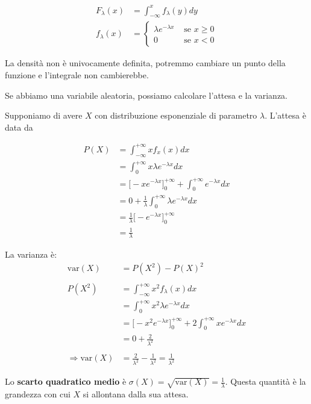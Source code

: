 \documentclass[a4paper,12pt]{book}
\newcommand\ddfrac[2]{\frac{\displaystyle #1}{\displaystyle #2}}
\begin{document}
\begin{align*}
	F_\lambda (x) & = \int_{-\infty}^{x} f_\lambda(y)dy \\
	f_\lambda (x) & = \begin{cases}
		\lambda e ^{-\lambda x} & \text{ se } x \ge 0 \\
		0 & \text{ se } x < 0
	\end{cases}
\end{align*}

La densità non è univocamente definita, potremmo cambiare un punto della funzione e l'integrale non cambierebbe. 

Se abbiamo una variabile aleatoria, possiamo calcolare l'attesa e la varianza. 

Supponiamo di avere $ X $ con distribuzione esponenziale di parametro $\lambda$. L'attesa è data da 

\begin{align*}
	P(X) & = \int_{-\infty}^{+\infty} x f_x(x) dx \\
	& = \int_{0}^{+\infty}x \lambda e ^{-\lambda x}dx \\
	& = \bigg[-xe^{-\lambda x} \bigg]_0^{+\infty} + \int_{0}^{+\infty} e ^{-\lambda x}dx  \\
	& = 0 + \frac{1}{\lambda}\int_{0}^{+\infty} \lambda e^{-\lambda x} dx \\
	& = \frac{1}{\lambda}\bigg[-e^{-\lambda x} \bigg]_0^{+\infty} \\
	& = \frac{1}{\lambda}
\end{align*}

La varianza è:
\begin{align*}
	\text{var}(X) & = P(X^2) - P(X)^2 \\
	\\
	P(X^2) & = \int_{-\infty}^{+\infty} x^2 f_\lambda(x) dx \\
	& = \int_{0}^{+\infty} x^2 \lambda e^{-\lambda x} dx \\
	& = \bigg[-x^2e^{-\lambda x} \bigg]_0^{+\infty} + 2\int_0^{+\infty} x e^{-\lambda x} dx \\
	& = 0 + \frac{2}{\lambda^2} \\
	\\
	\Rightarrow \text{var}(X) & = \frac{2}{\lambda^2} - \frac{1}{\lambda^2} = \frac{1}{\lambda^2}
\end{align*}

Lo \textbf{scarto quadratico medio} è $\sigma(X) = \sqrt{\text{var}(X)} = \ddfrac{1}{\lambda}$. %
Questa quantità è la grandezza con cui $ X $ si allontana dalla sua attesa. 
\end{document}
